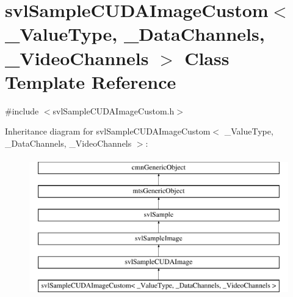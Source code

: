 \hypertarget{classsvl_sample_c_u_d_a_image_custom}{\section{svl\-Sample\-C\-U\-D\-A\-Image\-Custom$<$ \-\_\-\-Value\-Type, \-\_\-\-Data\-Channels, \-\_\-\-Video\-Channels $>$ Class Template Reference}
\label{classsvl_sample_c_u_d_a_image_custom}
}


{\ttfamily \#include $<$svl\-Sample\-C\-U\-D\-A\-Image\-Custom.\-h$>$}

Inheritance diagram for svl\-Sample\-C\-U\-D\-A\-Image\-Custom$<$ \-\_\-\-Value\-Type, \-\_\-\-Data\-Channels, \-\_\-\-Video\-Channels $>$\-:\begin{figure}[H]
\begin{center}
\leavevmode
\includegraphics[height=6.000000cm]{d5/d8d/classsvl_sample_c_u_d_a_image_custom}
\end{center}
\end{figure}
